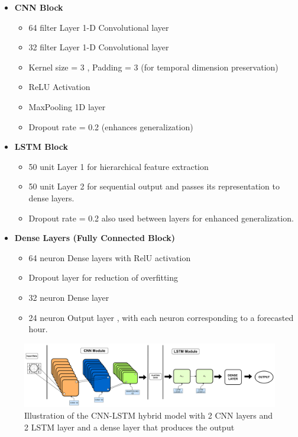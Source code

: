 \begin{itemize}
	\item \textbf{CNN Block}   \begin{itemize}
		\item 64 filter Layer 1-D Convolutional layer
		\item 32 filter Layer 1-D Convolutional layer
		\item Kernel size = 3 , Padding = 3 (for temporal dimension preservation)
		\item ReLU Activation 
		\item MaxPooling 1D layer
		\item Dropout rate =  0.2 (enhances generalization)
	\end{itemize}
	\item \textbf{LSTM Block} \begin{itemize}
		\item 50 unit Layer 1 for hierarchical feature extraction
		\item 50 unit Layer 2 for sequential output and passes its representation to dense layers.
		\item Dropout rate = 0.2 also used between layers for enhanced generalization.
	\end{itemize}
	\item \textbf{Dense Layers (Fully Connected Block)}  \begin{itemize}
		\item 64 neuron Dense layers with RelU activation
		\item Dropout layer for reduction of overfitting
		\item 32 neuron Dense layer
		\item 24 neuron Output layer , with each neuron corresponding to a forecasted hour.
	\end{itemize}
\end{itemize}
\begin{figure}[h]
	\centering
	\includegraphics[width=0.9\linewidth]{Chapters/images/CNN-LSTM}
	\caption{Illustration of the CNN-LSTM hybrid model with 2 CNN layers and 2 LSTM layer and a dense layer that produces the output}
	\label{fig:cnn-lstm}
\end{figure}



